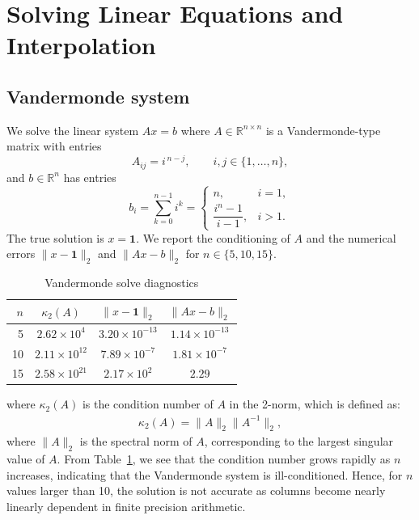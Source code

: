 \section{Solving Linear Equations and Interpolation}

\subsection{Vandermonde system}
We solve the linear system \(Ax=b\) where \(A\in\mathbb{R}^{n\times n}\) is a Vandermonde-type matrix with entries
\[
  A_{ij} = i^{\,n-j}, \qquad i,j\in\{1,\dots,n\},
\]
and \(b\in\mathbb{R}^{n}\) has entries
\[
  b_i = \sum_{k=0}^{n-1} i^k
  = \begin{cases}
  n, & i=1,\\
  \dfrac{i^n - 1}{i-1}, & i>1.
  \end{cases}
\]
The true solution is \(x=\mathbf{1}\). We report the conditioning of \(A\) and the numerical errors \(\lVert x-\mathbf{1}\rVert_2\) and \(\lVert Ax-b\rVert_2\) for \(n\in\{5,10,15\}\).

\begin{table}[H]
\centering
\caption{Vandermonde solve diagnostics}
\label{tab:pset1-vandermonde}
\begin{tabular}{rccc}
\toprule
\(n\) & \(\kappa_2(A)\) & \(\lVert x-\mathbf{1}\rVert_2\) & \(\lVert Ax-b\rVert_2\) \\
\midrule
5 & \(2.62\times 10^{4}\) & \(3.20\times 10^{-13}\) & \(1.14\times 10^{-13}\) \\
10 & \(2.11\times 10^{12}\) & \(7.89\times 10^{-7}\) & \(1.81\times 10^{-7}\) \\
15 & \(2.58\times 10^{21}\) & \(2.17\times 10^{2}\) & \(2.29\) \\
\bottomrule
\end{tabular}
\end{table}

\noindent where \(\kappa_2(A)\) is the condition number of \(A\) in the 2-norm, which is defined as:
\begin{align}
\kappa_2(A) = \|A\|_2 \|A^{-1}\|_2,
\end{align}
where $ \|A\|_2$ is the spectral norm of $A$, corresponding to the largest singular value of $A$. From Table~\ref{tab:pset1-vandermonde}, we see that the condition number grows rapidly as $n$ increases, indicating that the Vandermonde system is ill-conditioned. Hence, for $n$ values larger than 10, the solution is not accurate as columns become nearly linearly dependent in finite precision arithmetic.


